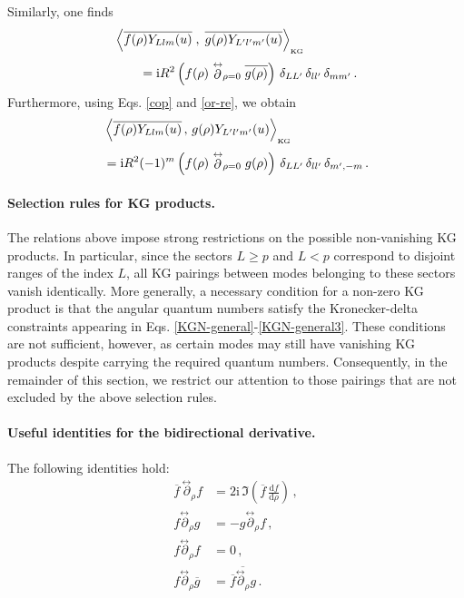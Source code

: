 \documentclass[aps,twocolumn,nofootinbib]{revtex4}
\begin{document}
{\begin{appendix}
Similarly, one finds
\begin{align}\label{KGN-general2}
    &\left\langle \overline{f(\rho)Y_{Llm}(u)} \;,\; \overline{g(\rho)Y_{L^\prime l^\prime m^\prime}(u)}\right\rangle_{\vphantom{}_{\text{KG}}}\nonumber\\[3pt]
    & \qquad = \mathrm{i} R^2 \left( f(\rho) \stackrel{\leftrightarrow}{\partial}_{\rho=0} \overline{g(\rho)} \right) \,\delta_{LL^\prime} \,\delta_{ll^\prime} \,\delta_{mm^\prime} \,.
\end{align}
Furthermore, using Eqs. \eqref{cop} and \eqref{or-re}, we obtain
\begin{align}\label{KGN-general3}
    &\left\langle \overline{f(\rho)Y_{Llm}(u)} \,,\, g(\rho)Y_{L^\prime l^\prime m^\prime}(u)\right\rangle_{\vphantom{}_{\text{KG}}} \nonumber \\[3pt]
    & = \mathrm{i} R^2 (-1)^{m} \left(f(\rho) \stackrel{\leftrightarrow}{\partial}_{\rho=0}g(\rho) \right) \,\delta_{LL^\prime} \,\delta_{ll^\prime} \,\delta_{m^\prime,-m} \,.
\end{align}

\paragraph{Selection rules for KG products.} The relations above impose strong restrictions on the possible non-vanishing KG products. In particular, since the sectors $L\geqslant p$ and $L<p$ correspond to disjoint ranges of the index $L$, all KG pairings between modes belonging to these sectors vanish identically. More generally, a necessary condition for a non-zero KG product is that the angular quantum numbers satisfy the Kronecker-delta constraints appearing in Eqs. \eqref{KGN-general}-\eqref{KGN-general3}. These conditions are not sufficient, however, as certain modes may still have vanishing KG products despite carrying the required quantum numbers. Consequently, in the remainder of this section, we restrict our attention to those pairings that are not excluded by the above selection rules.

\paragraph{Useful identities for the bidirectional derivative.}\label{bid_iden} The following identities hold:
\begin{align}
    \overline{f}\,
    \stackrel{\leftrightarrow}{\partial}_{\rho} f
    &= 2\mathrm{i}\, \Im\!\left(\overline{f}\,\frac{\mathrm{d}f}{\mathrm{d}\rho}\right)\,, \label{help-re 1}\\[2pt]
    f\stackrel{\leftrightarrow}{\partial}_{\rho}g
    &= -g\stackrel{\leftrightarrow}{\partial}_{\rho}f \,, \label{help-re 4}\\[2pt]
    f\stackrel{\leftrightarrow}{\partial}_{\rho}f
    &=0 \,, \label{help-re 41}\\[2pt]
    f\stackrel{\leftrightarrow}{\partial}_{\rho}\overline{g}
    & = \overline{\overline{f}\stackrel{\leftrightarrow}{\partial}_{\rho}g}\,. \label{help-re 45}
\end{align} 


\end{appendix}}
\end{document}

